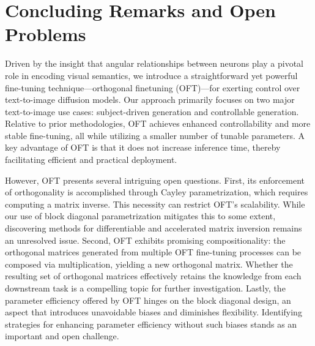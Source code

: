 \section{Concluding Remarks and Open Problems}

Driven by the insight that angular relationships between neurons play a pivotal role in encoding visual semantics, we introduce a straightforward yet powerful fine-tuning technique—orthogonal finetuning (OFT)—for exerting control over text-to-image diffusion models. Our approach primarily focuses on two major text-to-image use cases: subject-driven generation and controllable generation. Relative to prior methodologies, OFT achieves enhanced controllability and more stable fine-tuning, all while utilizing a smaller number of tunable parameters. A key advantage of OFT is that it does not increase inference time, thereby facilitating efficient and practical deployment.

However, OFT presents several intriguing open questions. First, its enforcement of orthogonality is accomplished through Cayley parametrization, which requires computing a matrix inverse. This necessity can restrict OFT's scalability. While our use of block diagonal parametrization mitigates this to some extent, discovering methods for differentiable and accelerated matrix inversion remains an unresolved issue. Second, OFT exhibits promising compositionality: the orthogonal matrices generated from multiple OFT fine-tuning processes can be composed via multiplication, yielding a new orthogonal matrix. Whether the resulting set of orthogonal matrices effectively retains the knowledge from each downstream task is a compelling topic for further investigation. Lastly, the parameter efficiency offered by OFT hinges on the block diagonal design, an aspect that introduces unavoidable biases and diminishes flexibility. Identifying strategies for enhancing parameter efficiency without such biases stands as an important and open challenge.